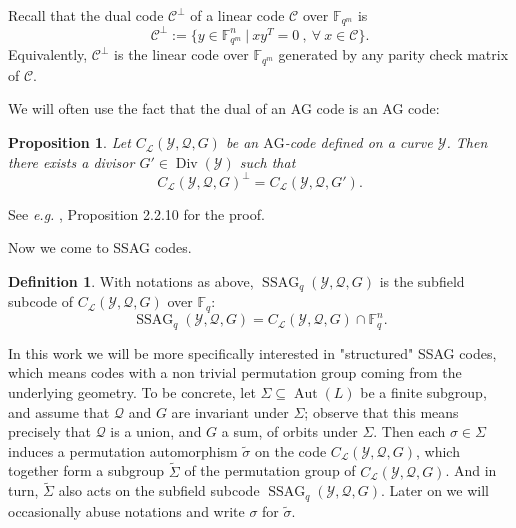 \documentclass[10pt]{article}
\newtheorem{prop1}[thm]{Proposition}
\theoremstyle{definition}
\theoremstyle{definition}
\theoremstyle{definition}
\newtheorem{def1}[thm]{Definition}
\newcommand{\PP}{\mathbb{P}}
\newcommand{\Fqm}{\mathbb{F}_{q^m}}
\newcommand{\Fq}{\mathbb{F}_q}
\newcommand{\su}{\subseteq}
\newcommand{\Y}{\mathcal{Y}}
\newcommand{\QR}{\mathcal{Q}}
\newcommand{\Div}{\operatorname{Div}}
\newcommand{\Aut}{\operatorname{Aut}}
\newcommand{\ssag}{\operatorname{SSAG}}
\newcommand{\calL}{\mathcal{L}}
\begin{document}
Recall that the dual code $\mathcal{C}^{\perp}$ of a
linear code $\mathcal{C}$ over $\Fqm$ is
\[\mathcal{C}^{\perp} := \{ y \in \Fqm^n \ | \ xy^T = 0 \ , \ \forall \ x \in \mathcal{C}\}.\]
Equivalently, $\mathcal{C}^{\perp}$ is the linear code over $\Fqm$ generated by any parity check matrix of $\mathcal{C}$.

We will often use the fact that the dual of an AG code is an AG code:

\begin{prop1} \label{dual}
Let $C_{\calL}(\Y,\QR,G)$ be an $\mathrm{AG}$-code defined on a curve $\Y$. Then there exists a divisor $G' \in \Div(\Y)$ such that 
\[C_{\calL}(\Y,\QR,G)^{\perp} = C_{\calL}(\Y,\QR,G').\]
\end{prop1}
See \emph{e.g.} \cite{Sti}, Proposition 2.2.10 for the proof.

Now we come to SSAG codes.

\begin{def1}
With notations as above, $\ssag_q(\Y,\QR,G)$ is the subfield subcode of $C_{\calL}(\Y,\QR,G)$ over $\Fq$:
\[ \ssag_q(\Y,\QR,G) = C_{\calL}(\Y,\QR,G) \cap \Fq^n.\]
\end{def1}

In this work we will be more specifically interested in "structured" SSAG codes, which means codes with a non trivial permutation group coming from the underlying geometry.
To be concrete, let $\Sigma \su \Aut(L)$ be a finite subgroup, 
and assume that $\QR$ and $G$ are invariant under $\Sigma$;
observe that this means precisely that $\QR$ is a union, and $G$ a sum, of orbits under $\Sigma$.
Then each $\sigma\in\Sigma$ induces a permutation automorphism $\tilde{\sigma}$ on the code $C_{\calL}(\Y,\QR,G)$, which together form a subgroup $\tilde{\Sigma}$ of the permutation group of $C_{\calL}(\Y,\QR,G)$. 
And in turn, $\tilde{\Sigma}$ also acts on the subfield subcode $\ssag_q(\Y,\QR,G)$.
Later on we will occasionally abuse notations and write $\sigma$ for $\tilde{\sigma}$.

%
\end{document}

